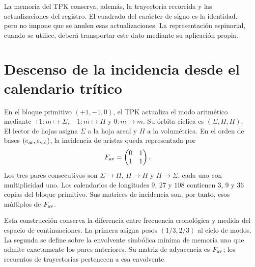 La memoria del TPK conserva, además, la trayectoria recorrida y las actualizaciones
del registro. El cuadrado del carácter de signo es la identidad, pero no impone
que se anulen esas actualizaciones. La representación espinorial, cuando se
utilice, deberá transportar este dato mediante su aplicación propia.

\section{Descenso de la incidencia desde el calendario trítico}

En el bloque primitivo $(+1,-1,0)$, el TPK actualiza el modo aritmético mediante
$+1:m\mapsto\Sigma$, $-1:m\mapsto\Pi$ y $0:m\mapsto m$. Su órbita cíclica
es $(\Sigma,\Pi,\Pi)$. El lector de hojas asigna $\Sigma$ a la hoja areal y
$\Pi$ a la volumétrica. En el orden de bases $(e_{\rm ar},e_{\rm vol})$, la
incidencia de aristas queda representada por
\begin{equation}
 F_{\rm av}=\begin{pmatrix}0&1\\1&1\end{pmatrix}.
 \label{x_reciprocidad:iii:eq:fav}
\end{equation}
Los tres pares consecutivos son $\Sigma\to\Pi$, $\Pi\to\Pi$ y
$\Pi\to\Sigma$, cada uno con multiplicidad uno. Los calendarios de longitudes
$9$, $27$ y $108$ contienen $3$, $9$ y $36$ copias del bloque primitivo. Sus
matrices de incidencia son, por tanto, esos múltiplos de $F_{\rm av}$.

Esta construcción conserva la diferencia entre frecuencia cronológica y medida
del espacio de continuaciones. La primera asigna pesos $(1/3,2/3)$ al ciclo
de modos. La segunda se define sobre la envolvente simbólica mínima de memoria
uno que admite exactamente los pares anteriores. Su matriz de adyacencia es
$F_{\rm av}$; los recuentos de trayectorias pertenecen a esa envolvente.

